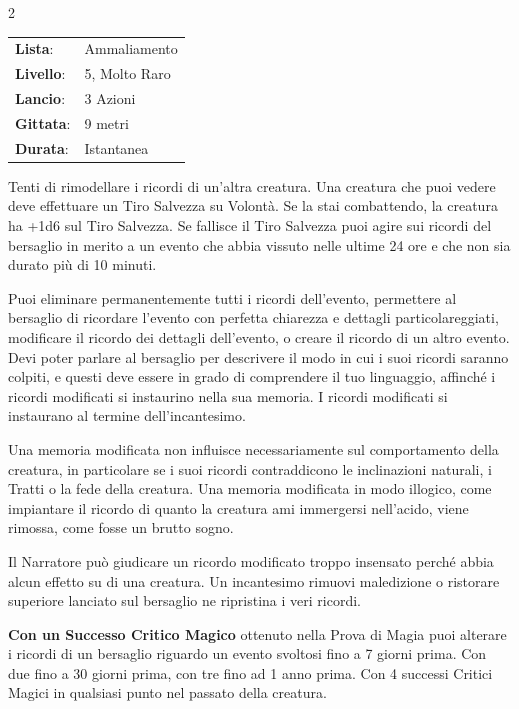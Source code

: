 \begin{multicols}{2}
\noindent\begin{tabularx}{\linewidth}{p{1.9cm}X}
	\rowcolor{gray!20}\textbf{Lista}: & Ammaliamento \\
	\textbf{Livello}: & 5, Molto Raro \\
	\rowcolor{gray!20}\textbf{Lancio}: & 3 Azioni \\
	\textbf{Gittata}: & 9 metri \\
	\rowcolor{gray!20}\textbf{Durata}: & Istantanea \\
\end{tabularx}\smallskip

Tenti di rimodellare i ricordi di un'altra creatura. Una creatura che puoi vedere deve effettuare un Tiro Salvezza su Volontà. Se la stai combattendo, la creatura ha +1d6 sul Tiro Salvezza. Se fallisce il Tiro Salvezza puoi agire sui ricordi del bersaglio in merito a un evento che abbia vissuto nelle ultime 24 ore e che non sia durato più di 10 minuti.

Puoi eliminare permanentemente tutti i ricordi dell'evento, permettere al bersaglio di ricordare l'evento con perfetta chiarezza e dettagli particolareggiati, modificare il ricordo dei dettagli dell'evento, o creare il ricordo di un altro evento. Devi poter parlare al bersaglio per descrivere il modo in cui i suoi ricordi saranno colpiti, e questi deve essere in grado di comprendere il tuo linguaggio, affinché i ricordi modificati si instaurino nella sua memoria.
I ricordi modificati si instaurano al termine dell'incantesimo.

Una memoria modificata non influisce necessariamente sul comportamento della creatura, in particolare se i suoi ricordi contraddicono le inclinazioni naturali, i Tratti o la fede della creatura. Una memoria modificata in modo illogico, come impiantare il ricordo di quanto la creatura ami immergersi nell'acido, viene rimossa, come fosse un brutto sogno.

Il Narratore può giudicare un ricordo modificato troppo insensato perché abbia alcun effetto su di una creatura. Un incantesimo rimuovi maledizione o ristorare superiore lanciato sul bersaglio ne ripristina i veri ricordi.

\textbf{Con un Successo Critico Magico} ottenuto nella Prova di Magia puoi alterare i ricordi di un bersaglio riguardo un evento svoltosi fino a 7 giorni prima. Con due fino a 30 giorni prima, con tre fino ad 1 anno prima. Con 4 successi Critici Magici in qualsiasi punto nel passato della creatura.


\end{multicols}
